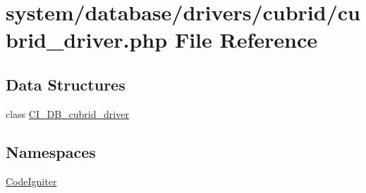 \hypertarget{cubrid__driver_8php}{\section{system/database/drivers/cubrid/cubrid\-\_\-driver.php File Reference}
\label{cubrid__driver_8php}
}
\subsection*{Data Structures}
\begin{DoxyCompactItemize}
\item 
class \hyperlink{class_c_i___d_b__cubrid__driver}{C\-I\-\_\-\-D\-B\-\_\-cubrid\-\_\-driver}
\end{DoxyCompactItemize}
\subsection*{Namespaces}
\begin{DoxyCompactItemize}
\item 
\hyperlink{namespace_code_igniter}{Code\-Igniter}
\end{DoxyCompactItemize}
